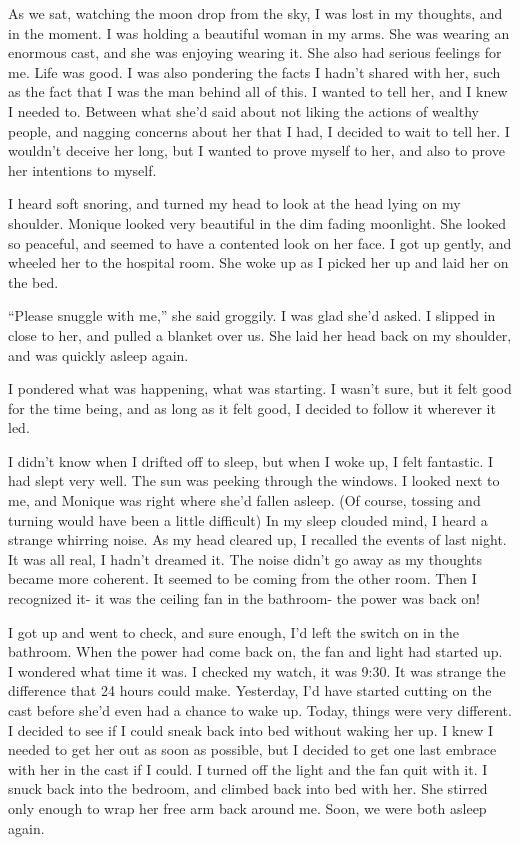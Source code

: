 As we sat, watching the moon drop from the sky, I was lost in my thoughts, and in the
moment. I was holding a beautiful woman in my arms. She was wearing an enormous cast, and she
was enjoying wearing it. She also had serious feelings for me. Life was good. I was also
pondering the facts I hadn't shared with her, such as the fact that I was the man behind all of
this. I wanted to tell her, and I knew I needed to. Between what she'd said about not liking the
actions of wealthy people, and nagging concerns about her that I had, I decided to wait to tell
her. I wouldn't deceive her long, but I wanted to prove myself to her, and also to prove her
intentions to myself.

I heard soft snoring, and turned my head to look at the head lying on my shoulder. Monique
looked very beautiful in the dim fading moonlight. She looked so peaceful, and seemed to have a
contented look on her face. I got up gently, and wheeled her to the hospital room. She woke up
as I picked her up and laid her on the bed.

``Please snuggle with me,'' she said groggily. I was glad she'd asked. I slipped in close
to her, and pulled a blanket over us. She laid her head back on my shoulder, and was quickly
asleep again.

I pondered what was happening, what was starting. I wasn't sure, but it felt good for the
time being, and as long as it felt good, I decided to follow it wherever it led.

I didn't know when I drifted off to sleep, but when I woke up, I felt fantastic. I had
slept very well. The sun was peeking through the windows. I looked next to me, and Monique was
right where she'd fallen asleep. (Of course, tossing and turning would have been a little
difficult) In my sleep clouded mind, I heard a strange whirring noise. As my head cleared up, I
recalled the events of last night. It was all real, I hadn't dreamed it. The noise didn't go
away as my thoughts became more coherent. It seemed to be coming from the other room. Then I
recognized it- it was the ceiling fan in the bathroom- the power was back on!

I got up and went to check, and sure enough, I'd left the switch on in the bathroom. When
the power had come back on, the fan and light had started up. I wondered what time it was. I
checked my watch, it was 9:30. It was strange the difference that 24 hours could make.
Yesterday, I'd have started cutting on the cast before she'd even had a chance to wake up.
Today, things were very different. I decided to see if I could sneak back into bed without
waking her up. I knew I needed to get her out as soon as possible, but I decided to get one last
embrace with her in the cast if I could. I turned off the light and the fan quit with it. I
snuck back into the bedroom, and climbed back into bed with her. She stirred only enough to wrap
her free arm back around me. Soon, we were both asleep again.

